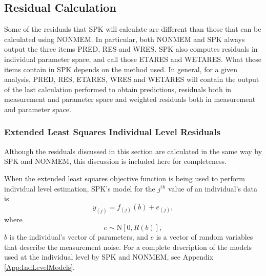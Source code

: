 \documentclass{article}
\begin{document}
\subsection{Residual Calculation}

Some of the residuals that SPK will calculate are different than those
that can be calculated using NONMEM. 
In particular, both NONMEM and SPK always output the three items PRED,
RES and WRES. SPK also computes residuals in individual parameter space,
and call those ETARES and WETARES. What these items contain in SPK depends 
on the method used. In general, for a given analysis, PRED, RES, ETARES,
WRES and WETARES will contain the output of the last calculation performed 
to obtain predictions, residuals both in measurement and parameter space and 
weighted residuals both in measurement and parameter space.

\subsubsection{Extended Least Squares Individual Level Residuals}

Although the residuals discussed in this section are calculated in the
same way by SPK and NONMEM, this discussion is included here for
completeness.

When the extended least squares objective function is being used
to perform individual level estimation,
SPK's model for the $j^{\mbox{th}}$ value of an individual's data is
  \begin{equation}
    y_{(j)} = f_{(j)}(b) + e_{(j)} ,
  \end{equation}
where
  \begin{equation}
    e \sim \mbox{N}[ 0, R(b) ] ,
  \end{equation}
$b$ is the individual's vector of parameters, and $e$ is a vector of 
random variables that describe the measurement noise.
For a complete description of the models used at the individual 
level by SPK and NONMEM, see Appendix \ref{App:IndLevelModels}.
\end{document}
